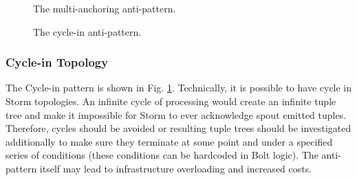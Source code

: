 \begin{figure}
\centering 
{}\caption{The multi-anchoring anti-pattern.}\label{fig:multi-anchoring1}
\caption{The cycle-in anti-pattern.}\label{fig:cycle1}
\end{figure}


\subsubsection{Cycle-in Topology}

The Cycle-in pattern is shown in Fig. \ref{fig:cycle1}. Technically, it is possible to have cycle in Storm topologies. An infinite cycle of processing would create an infinite tuple tree and make it impossible for Storm to ever acknowledge spout emitted tuples. Therefore, cycles should be avoided or resulting tuple trees should be investigated additionally to make sure they terminate at some point and under a specified series of conditions (these conditions can be hardcoded in Bolt logic). The anti-pattern itself may lead to infrastructure overloading and increased costs.


